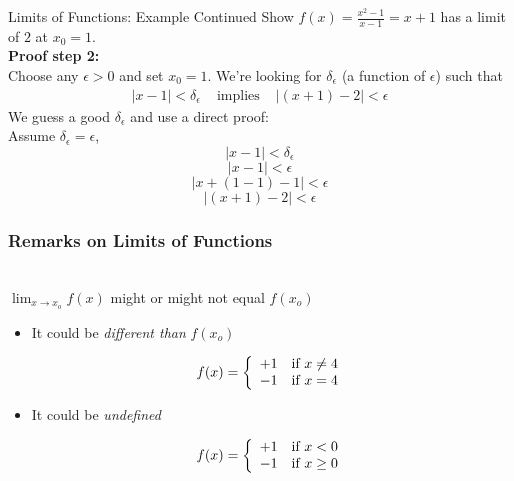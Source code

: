 \documentclass[handout]{beamer}
\numberwithin{equation}{section}
\begin{document}
\begin{frame}{Limits of Functions: Example Continued}
Show $f(x) = \frac{x^2 - 1}{x - 1} =x+1$ has a limit of $2$ at $x_{0} = 1$.\\
 
\textbf{Proof step 2:}\\\pause
Choose any $\epsilon >0$ and set $x_{0}=1$.  We're looking for $\delta_{\epsilon}$ (a function of $\epsilon$) such that 
\begin{eqnarray}
|x - 1|< \delta_{\epsilon} & \text{ implies } & |(x + 1) - 2| < \epsilon \nonumber 
\end{eqnarray} \pause
We guess a good $\delta_{\epsilon}$ and use a direct proof:\\
Assume $\delta_{\epsilon} = \epsilon$,\pause  
$$|x - 1|< \delta_{\epsilon}$$
$$|x - 1|< \epsilon$$\pause
$$|x +(1-1) - 1|< \epsilon$$\pause
$$|(x +1)- 2|< \epsilon$$		

\end{frame}

\begin{frame}
\frametitle{Remarks on Limits of Functions}

\ \\$\lim_{x\rightarrow x_o}f(x)$ might or might not equal $f(x_o)$ \pause

\begin{itemize}
\item It could be \textit{different than} $f(x_o)$ \pause

 \[
    f(x)=\left\{
                \begin{array}{lll}
                  +1&\hbox{if } x\not=4\\
                  -1&\hbox{if } x=4
                \end{array}
              \right.
  \] \pause


\item It could be \textit{undefined} \pause

 \[
    f(x)=\left\{
                \begin{array}{lll}
                  +1&\hbox{if } x<0\\
                  -1&\hbox{if } x\geq 0
                \end{array}
              \right.
  \]

\end{itemize}

\end{frame}
\end{document}
